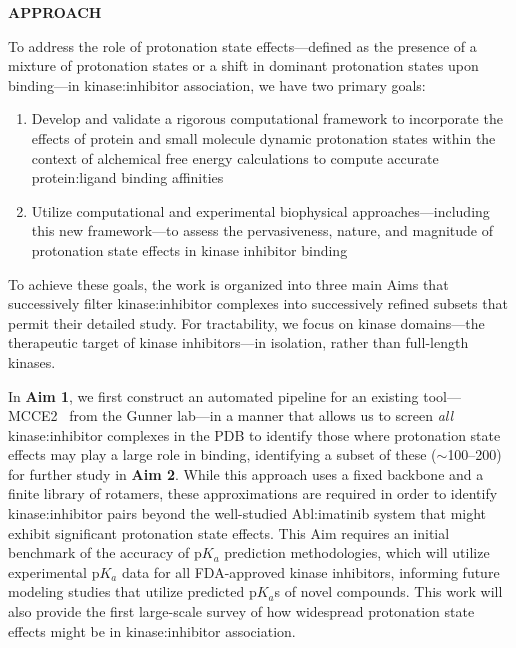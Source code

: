 \documentclass[11pt]{article}
\begin{document}
{\large \bf APPROACH}

To address the role of protonation state effects---defined as the presence of a mixture of protonation states or a shift in dominant protonation states upon binding---in kinase:inhibitor association, we have two primary goals:
\begin{enumerate}
  \vspace{-0.15in}
  \item Develop and validate a rigorous computational framework to incorporate the effects of protein and small molecule dynamic protonation states within the context of alchemical free energy calculations to compute accurate protein:ligand binding affinities
  \vspace{-0.1in}
  \item Utilize computational and experimental biophysical approaches---including this new framework---to assess the pervasiveness, nature, and magnitude of protonation state effects in kinase inhibitor binding
  \vspace{-0.15in}
\end{enumerate}
To achieve these goals, the work is organized into three main Aims that successively filter kinase:inhibitor complexes into successively refined subsets that permit their detailed study.
For tractability, we focus on kinase domains---the therapeutic target of kinase inhibitors---in isolation, rather than full-length kinases.

In {\bf Aim 1}, we first construct an automated pipeline for an existing tool---MCCE2~\cite{gunner:bba:2000:proton-electron-transfer,gunner:j-comput-chem:2009:mcce2} from the Gunner lab---in a manner that allows us to screen \emph{all} kinase:inhibitor complexes in the PDB to identify those where protonation state effects may play a large role in binding, identifying a subset of these ($\sim$100--200) for further study in {\bf Aim 2}.
While this approach uses a fixed backbone and a finite library of rotamers, these approximations are required in order to identify kinase:inhibitor pairs beyond the well-studied Abl:imatinib system that might exhibit significant protonation state effects.
This Aim requires an initial benchmark of the accuracy of p$K_a$ prediction methodologies, which will utilize experimental p$K_a$ data for all FDA-approved kinase inhibitors, informing future modeling studies that utilize predicted p$K_a$s of novel compounds.
This work will also provide the first large-scale survey of how widespread protonation state effects might be in kinase:inhibitor association.
\end{document}
